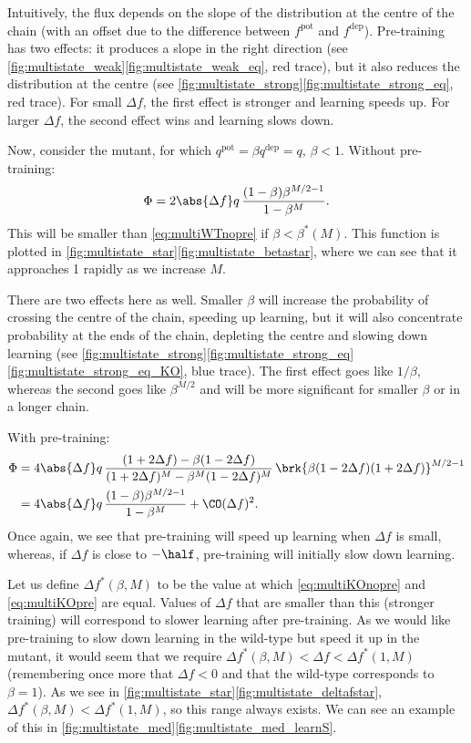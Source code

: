 \documentclass[12pt]{article}
\newcommand{\pot}{^{\text{pot}}}
\newcommand{\dep}{^{\text{dep}}}
\begin{document}
Intuitively, the flux depends on the slope of the distribution at the centre of the chain (with an offset due to the difference between $f\pot$ and $f\dep$).
Pre-training has two effects: it produces a slope in the right direction (see \autoref{fig:multistate_weak}\ref{fig:multistate_weak_eq}, red trace), but it also reduces the distribution at the centre (see \autoref{fig:multistate_strong}\ref{fig:multistate_strong_eq}, red trace).
For small $\Delta f$, the first effect is stronger and learning speeds up.
For larger $\Delta f$, the second effect wins and learning slows down.

Now, consider the mutant, for which $q\pot=\beta q\dep=q$, $\beta<1$.
Without pre-training:
%
\begin{equation}\label{eq:multiKOnopre}
  \Phi = 2\abs{\Delta f} q\,\frac{(1-\beta)\beta^{M/2-1}}{1-\beta^M}.
\end{equation}
%
This will be smaller than \eqref{eq:multiWTnopre} if $\beta<\beta^*(M)$.
This function is plotted in \autoref{fig:multistate_star}\ref{fig:multistate_betastar}, where we can see that it approaches 1 rapidly as we increase $M$.

There are two effects here as well.
Smaller $\beta$ will increase the probability of crossing the centre of the chain, speeding up learning, but it will also concentrate probability at the ends of the chain, depleting the centre and slowing down learning (see \autoref{fig:multistate_strong}\ref{fig:multistate_strong_eq}\ref{fig:multistate_strong_eq_KO}, blue trace).
The first effect goes like $1/\beta$, whereas the second goes like $\beta^{M/2}$ and will be more significant for smaller $\beta$ or in a longer chain.

With pre-training:
%
\begin{equation}\label{eq:multiKOpre}
\begin{aligned}
  \Phi &= 4\abs{\Delta f} q \, \frac{(1+2\Delta f) - \beta(1-2\Delta f)}
          {(1+2\Delta f)^M - \beta^M(1-2\Delta f)^M}   \,
          \brk{\beta (1-2\Delta f) (1+2\Delta f)}^{M/2-1} \\
       &= 4\abs{\Delta f} q\,\frac{(1-\beta)\beta^{M/2-1}}{1-\beta^M} + \CO(\Delta f)^2.
\end{aligned}
\end{equation}
%
Once again, we see that pre-training will speed up learning when $\Delta f$ is small, whereas, if $\Delta f$ is close to $-\half$, pre-training will initially slow down learning.

Let us define $\Delta f^*(\beta,M)$ to be the value at which \eqref{eq:multiKOnopre} and \eqref{eq:multiKOpre} are equal.
Values of $\Delta f$ that are smaller than this (stronger training) will correspond to slower learning after pre-training.
As we would like pre-training to slow down learning in the wild-type but speed it up in the mutant, it would seem that we require $\Delta f^*(\beta,M) < \Delta f < \Delta f^*(1,M)$ (remembering once more that $\Delta f<0$ and that the wild-type corresponds to $\beta=1$).
As we see in \autoref{fig:multistate_star}\ref{fig:multistate_deltafstar}, $\Delta f^*(\beta,M) < \Delta f^*(1,M)$, so this range always exists.
We can see an example of this in \autoref{fig:multistate_med}\ref{fig:multistate_med_learnS}.
\end{document}
